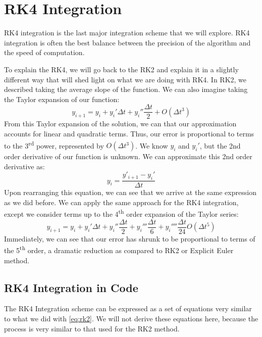 \documentclass[12pt]{report}
\begin{document}
\section{RK4 Integration}
RK4 integration is the last major integration scheme that we will explore. RK4 integration is often the best balance between the precision of the algorithm and the speed of computation. 

To explain the RK4, we will go back to the RK2 and explain it in a slightly different way that will shed light on what we are doing with RK4. In RK2, we described taking the average slope of the function. We can also imagine taking the Taylor expansion of our function:
$$y_{i+1}=y_i+y_i'\Delta t+y_i''\frac{\Delta t}{2}+O\left(\Delta t^3\right)$$
From this Taylor expansion of the solution, we can that our approximation accounts for linear and quadratic terms. Thus, our error is proportional to terms to the 3\textsuperscript{rd} power, represented by $O(\Delta t^3)$. We know $y_i$ and $y_i'$, but the 2nd order derivative of our function is unknown. We can approximate this 2nd order derivative as:
$$y_i=\frac{y'_{i+1}-y_i'}{\Delta t}$$
Upon rearranging this equation, we can see that we arrive at the same expression as we did before. We can apply the same approach for the RK4 integration, except we consider terms up to the 4\textsuperscript{th} order expansion of the Taylor series:
$$y_{i+1}=y_i+y_i'\Delta t+y_i''\frac{\Delta t}{2}+y_i'''\frac{\Delta t}{6}+y_i''''\frac{\Delta t}{24}O\left(\Delta t^5\right)$$
Immediately, we can see that our error has shrunk to be proportional to terms of the 5\textsuperscript{th} order, a dramatic reduction as compared to RK2 or Explicit Euler method.

\subsection{RK4 Integration in Code}
The RK4 Integration scheme can be expressed as a set of equations very similar to what we did with \eqref{eq:rk2}. We will not derive these equations here, because the process is very similar to that used for the RK2 method.
\end{document}
